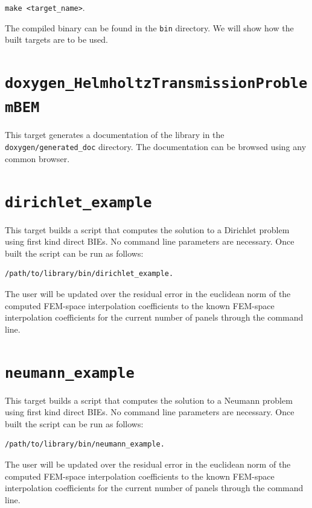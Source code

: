 \documentclass[a4paper, oneside]{discothesis}
\begin{document}
\verb|make <target_name>|.

The compiled binary can be found in the \verb|bin| directory.
We will show how the built targets are to be used.

\cprotect\section{\verb|doxygen_HelmholtzTransmissionProblemBEM|}
This target generates a documentation of the library in the \verb|doxygen/generated_doc| directory.
The documentation can be browsed using any common browser.

\cprotect\section{\verb|dirichlet_example|}
This target builds a script that computes the solution to a Dirichlet problem
using first kind direct BIEs.
No command line parameters are necessary.
Once built the script can be run as follows: 
\begin{verbatim}
/path/to/library/bin/dirichlet_example.
\end{verbatim}
The user will be updated over the residual error in the euclidean norm of the computed FEM-space interpolation coefficients to the known FEM-space interpolation coefficients for the current number of panels through the command line.

\cprotect\section{\verb|neumann_example|}
This target builds a script that computes the solution to a Neumann problem
using first kind direct BIEs.
No command line parameters are necessary.
Once built the script can be run as follows: 
\begin{verbatim}
/path/to/library/bin/neumann_example.
\end{verbatim}
The user will be updated over the residual error in the euclidean norm of the computed FEM-space interpolation coefficients to the known FEM-space interpolation coefficients for the current number of panels through the command line.
\end{document}

